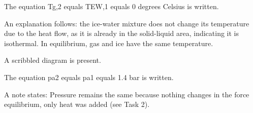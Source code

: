 The equation Tg,2 equals TEW,1 equals 0 degrees Celsius is written.

An explanation follows: the ice-water mixture does not change its temperature due to the heat flow, as it is already in the solid-liquid area, indicating it is isothermal. In equilibrium, gas and ice have the same temperature.

A scribbled diagram is present.

The equation pa2 equals pa1 equals 1.4 bar is written.

A note states: Pressure remains the same because nothing changes in the force equilibrium, only heat was added (see Task 2).